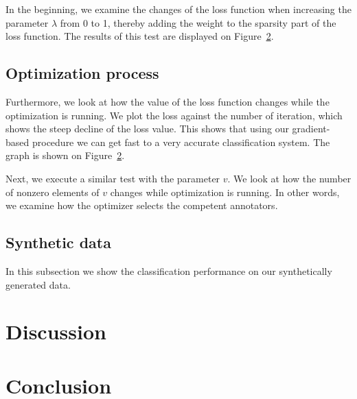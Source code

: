 \documentclass{llncs}
\begin{document}
In the beginning, we examine the changes of the loss function when increasing the parameter $\lambda$ from 0 to 1, thereby adding the weight to the sparsity part of the loss function. The results of this test are displayed on Figure~\ref{}.

\subsection{Optimization process}

Furthermore, we look at how the value of the loss function changes while the optimization is running. We plot the loss against the number of iteration, which shows the steep decline of the loss value. This shows that using our gradient-based procedure we can get fast to a very accurate classification system. The graph is shown on Figure~\ref{}.

Next, we execute a similar test with the parameter $v$. We look at how the number of nonzero elements of $v$ changes while optimization is running. In other words, we examine how the optimizer selects the competent annotators.

\subsection{Synthetic data}

In this subsection we show the classification performance on our synthetically generated data.




\section{Discussion}


\section{Conclusion}






%

%
\end{document}
